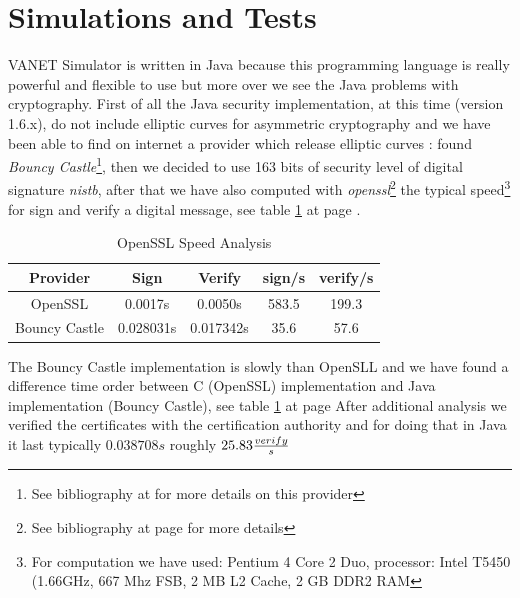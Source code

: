 \section{Simulations and Tests}
VANET Simulator is written in Java because this programming language is really powerful and flexible to use but more over we see the Java problems with cryptography. First of all the Java security implementation, at this time (version 1.6.x), do not include elliptic curves for asymmetric cryptography and we have been able to find  on internet a provider which release elliptic curves : found \textit{Bouncy Castle}\footnote{See bibliography at \pageref{bibliography} for more details on this provider}, then we decided to  use 163 bits  of security level of digital signature \textit{nistb}, after that we have also computed with \emph{openssl}\footnote{See bibliography at page \pageref{bibliography} for more details} the typical speed\footnote{For computation we have used: Pentium 4 Core 2 Duo, processor: Intel T5450 (1.66GHz, 667 Mhz FSB, 2 MB L2 Cache, 2 GB DDR2 RAM} for sign and verify a digital message, see table \ref{tab:OpensslVelocity} at page \pageref{tab:OpensslVelocity}.
\begin{table}[!ht]
	\centering
	\caption{OpenSSL Speed Analysis}
	\begin{tabular}{|c|c|c|c|c|}
	\hline\hline 
	\textbf{Provider} & \textbf{Sign} & \textbf{Verify} & \textbf{sign/s} & \textbf{verify/s} \\
	\hline
	OpenSSL & 0.0017s & 0.0050s & 583.5 & 199.3 \\
	\hline
	Bouncy Castle & 0.028031s & 0.017342s & 35.6 & 57.6 \\
	\hline
	\hline     %
 	\end{tabular} 
	\label{tab:OpensslVelocity}
\end{table}
The Bouncy Castle implementation is slowly than OpenSLL and we have found a difference time order  between C (OpenSSL)  implementation and Java implementation (Bouncy Castle), see table \ref{tab:OpensslVelocity} at page 
After additional analysis we verified the certificates with the certification authority and for doing that in Java it last typically $0.038708s$ roughly $25.83 {verify \over s}$
